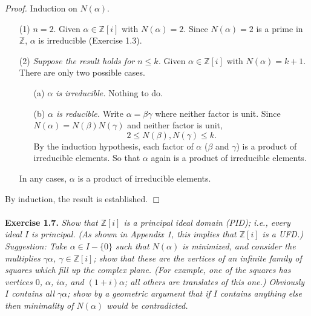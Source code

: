 \documentclass{article}
\begin{document}
\emph{Proof.}
Induction on $N(\alpha)$.
\begin{enumerate}
\item[(1)]
\emph{$n = 2$}.
Given $\alpha \in \mathbb{Z}[i]$ with $N(\alpha) = 2$.
Since $N(\alpha) = 2$ is a prime in $\mathbb{Z}$,
$\alpha$ is irreducible (Exercise 1.3).
\item[(2)]
\emph{Suppose the result holds for $n \leq k$.}
Given $\alpha \in \mathbb{Z}[i]$ with $N(\alpha) = k+1$.
There are only two possible cases.
\begin{enumerate}
\item[(a)]
\emph{$\alpha$ is irreducible.}
Nothing to do.
\item[(b)]
\emph{$\alpha$ is reducible.}
Write $\alpha = \beta\gamma$ where neither factor is unit.
Since $N(\alpha) = N(\beta)N(\gamma)$ and neither factor is unit,
$$2 \leq N(\beta), N(\gamma) \leq k.$$
By the induction hypothesis, each factor of $\alpha$ ($\beta$ and $\gamma$)
is a product of irreducible elements.
So that $\alpha$ again is a product of irreducible elements.
\end{enumerate}
In any cases,
$\alpha$ is a product of irreducible elements.
\end{enumerate}
By induction, the result is established.
$\Box$ \\\\






\textbf{Exercise 1.7.}
\emph{Show that $\mathbb{Z}[i]$ is a principal ideal domain (PID); i.e.,
every ideal $I$ is principal.
(As shown in Appendix 1, this implies that $\mathbb{Z}[i]$ is a UFD.)} \\

\emph{Suggestion: Take $\alpha \in I-\{0\}$ such that $N(\alpha)$ is minimized,
and consider the multiplies $\gamma\alpha$, $\gamma \in \mathbb{Z}[i]$;
show that these are the vertices of an infinite family of squares which
fill up the complex plane.
(For example,
one of the squares has vertices $0$, $\alpha$, $i\alpha$, and $(1+i)\alpha$;
all others are translates of this one.)
Obviously $I$ contains all $\gamma\alpha$;
show by a geometric argument that if $I$ contains anything else then
minimality of $N(\alpha)$ would be contradicted.} \\
\end{document}
